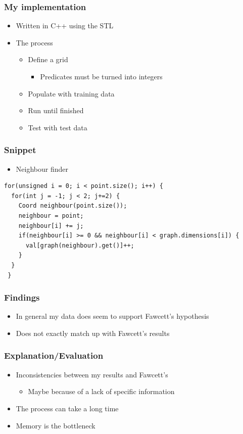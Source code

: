 \documentclass[presentation]{beamer}
\begin{document}
\begin{frame}
\frametitle{My implementation}
\label{sec-5}

\begin{itemize}
\item Written in C++ using the STL
\item The process

\begin{itemize}
\item Define a grid

\begin{itemize}
\item Predicates must be turned into integers
\end{itemize}

\item Populate with training data
\item Run until finished
\item Test with test data
\end{itemize}

\end{itemize}
\end{frame}
\begin{frame}[fragile]
\frametitle{Snippet}
\label{sec-6}

\begin{itemize}
\item Neighbour finder
\end{itemize}

\begin{verbatim}
for(unsigned i = 0; i < point.size(); i++) {
  for(int j = -1; j < 2; j+=2) {
    Coord neighbour(point.size());
    neighbour = point;
    neighbour[i] += j;
    if(neighbour[i] >= 0 && neighbour[i] < graph.dimensions[i]) {
      val[graph(neighbour).get()]++;
    }
  }
 }
\end{verbatim}
\end{frame}
\begin{frame}
\frametitle{Findings}
\label{sec-7}

\begin{itemize}
\item In general my data does seem to support Fawcett's hypothesis
\item Does not exactly match up with Fawcett's results
\end{itemize}
\end{frame}
\begin{frame}
\frametitle{Explanation/Evaluation}
\label{sec-8}

\begin{itemize}
\item Inconsistencies between my results and Fawcett's

\begin{itemize}
\item Maybe because of a lack of specific information
\end{itemize}

\item The process can take a long time
\item Memory is the bottleneck
\end{itemize}
\end{frame}
\end{document}

